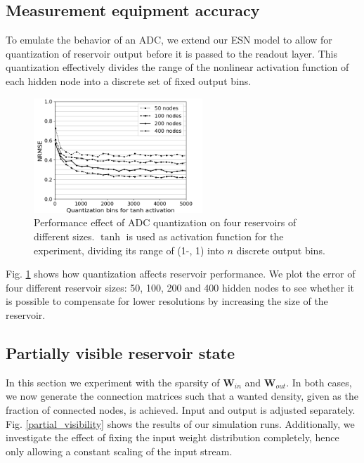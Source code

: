 \subsection{Measurement equipment accuracy}

To emulate the behavior of an ADC, we extend our ESN model to allow for
quantization of reservoir output before it is passed to the readout layer. This
quantization effectively divides the range of the nonlinear activation function
of each hidden node into a discrete set of fixed output bins.

\begin{figure}[H]
  \centering
  \includegraphics[width=2.5in]{img/adc_quantization.png}
  \caption{
    Performance effect of ADC quantization on four reservoirs of different
sizes. $\tanh$ is used as activation function for the experiment, dividing its
range of (1-, 1) into $n$ discrete output bins.
  }
  \label{adc_quantization}
\end{figure}


Fig. \ref{adc_quantization} shows how quantization affects reservoir
performance. We plot the error of four different reservoir sizes: 50, 100, 200
and 400 hidden nodes to see whether it is possible to compensate for lower
resolutions by increasing the size of the reservoir.

\subsection{Partially visible reservoir state}

In this section we experiment with the sparsity of $\mathbf{W}_{in}$ and
$\mathbf{W}_{out}$. In both cases, we now generate the connection matrices such
that a wanted density, given as the fraction of connected nodes, is
achieved. Input and output is adjusted separately. Fig. \ref{partial_visibility}
shows the results of our simulation runs. Additionally, we investigate the
effect of fixing the input weight distribution completely, hence only allowing a
constant scaling of the input stream.

